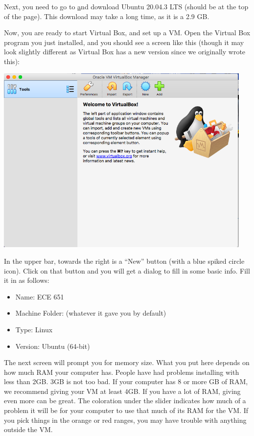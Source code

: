 \documentclass[12pt]{article}
\begin{document}
Next, you need to go to  \href{https://ubuntu.com/download/desktop}
and download Ubuntu 20.04.3 LTS (should be at the top of the page).  This download may take a long time,
as it is a 2.9 GB.  

Now, you are ready to start Virtual Box, and set up a VM.  Open the
Virtual Box program you just installed, and you should see a screen
like this (though it may look slightly different as Virtual Box has a new version since we
originally wrote this):

\begin{center}
\includegraphics[width=5.0in]{vbox1.png}
\end{center}

In the upper bar, towards the right is a ``New'' button (with a blue
spiked circle icon).  Click on that button and you will get a dialog
to fill in some basic info.  Fill it in as follows:
\begin{itemize}
\item Name: ECE 651
\item Machine Folder: (whatever it gave you by default)
\item Type: Linux
\item Version: Ubuntu (64-bit)
\end{itemize}

The next screen will prompt you for memory size.
What you put here  depends on how much RAM your computer has.
People have had problems installing with less than 2GB.  3GB
is not too bad.  If your computer has 8 or more GB of RAM,
we recommend giving your VM at least 4GB.
If you have a lot of RAM, giving even more can be great.
The coloration under the slider indicates how much of a problem
it will be for your computer to use that much of its RAM for the VM.
If you pick things in the orange or red ranges, you may have trouble
with anything outside the VM.
\end{document}
